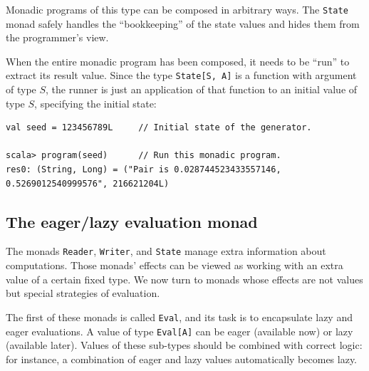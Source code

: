 Monadic programs of this type can be composed in arbitrary ways. The
\lstinline!State! monad safely handles the \textsf{``}bookkeeping\textsf{''} of the
state values and hides them from the programmer\textsf{'}s view.

When the entire monadic program has been composed, it needs to be
\textsf{``}run\textsf{''} to extract its result value. Since the type \lstinline!State[S, A]!
is a function with argument of type $S$, the runner
is just an application of that function to an initial value of type
$S$, specifying the initial state:
\begin{lstlisting}
val seed = 123456789L     // Initial state of the generator.

scala> program(seed)      // Run this monadic program.
res0: (String, Long) = ("Pair is 0.028744523433557146, 0.5269012540999576", 216621204L)
\end{lstlisting}


\subsection{The eager/lazy evaluation monad\label{subsec:The-eager-lazy-evaluation-monad}}

The monads \lstinline!Reader!, \lstinline!Writer!, and \lstinline!State!
manage extra information about computations. Those monads\textsf{'}
effects can be viewed as working with an extra value of a certain
fixed type. We now turn to monads whose effects are not values but
special strategies of evaluation. 

The first of these monads is called \lstinline!Eval!, and its task
is to encapsulate lazy and eager evaluations. A value of type \lstinline!Eval[A]!
can be eager (available now) or lazy (available later). Values of
these sub-types should be combined with correct logic: for instance,
a combination of eager and lazy values automatically becomes lazy.

